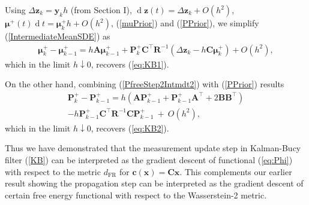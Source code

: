 \documentclass[letterpaper,10pt,twocolumn,conference]{ieeeconf}
\newcommand{\bbc}{\bm{c}}
\newcommand{\bbx}{{\bm{x}}}
\newcommand{\bby}{{\bm{y}}}
\newcommand{\bbz}{\bm{z}}
\newcommand{\bmu}{\bm{\mu}}
\newcommand{\bbmu}{\bm{\mu}}
\newcommand{\bbP}{{\bm{P}}}
\newcommand{\bbR}{\bm{R}}
\newcommand{\bbA}{\bm{A}}
\newcommand{\bbB}{\bm{B}}
\newcommand{\bbC}{\bm{C}}
\newcommand{\dFR}{d_{\mathrm{FR}}}
\newcommand{\differential}{\operatorname{d}}
\begin{document}
Using $\Delta \bbz_{k} = \bby_{k}h$ (from Section I), $\differential\bbz(t) = \Delta \bbz_{k} + O(h^2)$, $\bmu^{+}(t)\differential t = \bmu_{k}^{+}h + O(h^2)$, (\ref{muPrior}) and (\ref{PPrior}), we simplify (\ref{IntermediateMeanSDE}) as
{\small{\begin{eqnarray*}
\bbmu_{k}^{+} \!\!-\! \bbmu_{k-1}^{+} = h\bbA\bbmu_{k-1}^{+} + \bbP_{k}^{+}\bbC^{\top}\bbR^{-1}\left(\Delta\bbz_{k} - h\bbC\bbmu_{k}^{+}\right) + O(h^{2}),
\end{eqnarray*}}}
which in the limit $h\downarrow 0$, recovers (\ref{eq:KB1}).

On the other hand, combining (\ref{PfreeStep2Intmdt2}) with (\ref{PPrior}) results
\begin{eqnarray*}
\bbP_{k}^{+} - \bbP_{k-1}^{+} = h(\bbA\bbP_{k-1}^{+} + \bbP_{k-1}^{+}\bbA^{\top} + 2\bbB\bbB^{\top}) \nonumber\\
- h\bbP_{k-1}^{+}\bbC^{\top}\bbR^{-1}\bbC\bbP_{k-1}^{+} \:+\: O(h^{2}),	
\end{eqnarray*}
which in the limit $h\downarrow 0$, recovers (\ref{eq:KB2}).

Thus we have demonstrated that the measurement update step in Kalman-Bucy filter (\ref{KB}) can be interpreted as the gradient descent of functional (\ref{eq:Phi}) with respect to the metric $\dFR$ for $\bbc(\bbx)=\bbC\bbx$. This complements our earlier result \cite[Section III]{HalderGeorgiouCDC2017} showing the propagation step can be interpreted as the gradient descent of certain free energy functional with respect to the Wasserstein-2 metric.



%   
\end{document}
